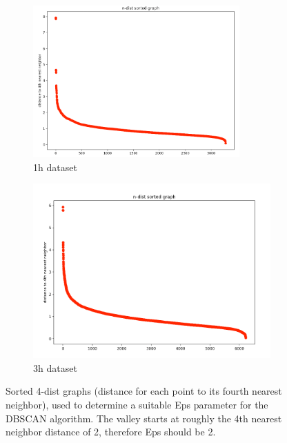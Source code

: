 \begin{figure}[H]
  \centering
  \begin{subfigure}{.5\textwidth}
    \centering
    \includegraphics[width=0.87\textwidth]{./images/kDistGraphDBSCAN1h.png}
  \caption{1h dataset}
  \label{figure:kDistGraphDBSCAN1h}
  \end{subfigure}%
  \hfill
  \begin{subfigure}{.5\textwidth}
    \centering
    \includegraphics[width=1\textwidth]{./images/kDistGraphDBSCAN3h.png}
    \caption{3h dataset}
    \label{figure:kDistGraphDBSCAN3h}
  \end{subfigure}
  \caption{Sorted 4-dist graphs (distance for each point to its fourth nearest neighbor), used to determine a suitable Eps parameter for the DBSCAN algorithm. The valley starts at roughly the 4th nearest neighbor distance of 2, therefore Eps should be 2.}
  \label{figure:kDistGraphDBSCAN}
  \end{figure}

